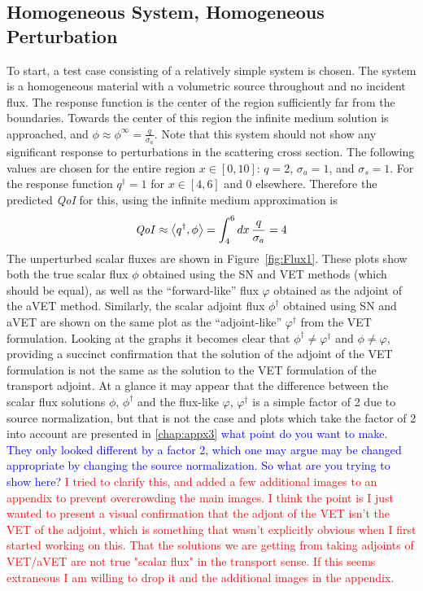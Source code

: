 \documentclass[12pt]{report}
\newcommand{\bra}{\left\langle}
\newcommand{\ket}{\right\rangle}
\newcommand{\sigs}{\sigma_s}
\newcommand{\siga}{\sigma_a}
\newcommand{\qoi}{{\it QoI}\xspace}
\newcommand{\comment}[2]{\marginpar{\textcolor{#2}{$\star$}}\textcolor{#2}{#1}\newline}
\newcommand{\iwh}[1]{\comment{#1}{red}}
\newcommand{\jcr}[1]{\comment{#1}{blue}}
\newcommand{\iwh}[1]{\phantom{a}}
\newcommand{\jcr}[1]{\phantom{a}}
\begin{document}
\subsection{Homogeneous System, Homogeneous Perturbation}
To start, a test case consisting of a relatively simple system is chosen. The system is a homogeneous material with a volumetric source throughout and no incident flux. The response function is the center of the region sufficiently far from the boundaries. Towards the center of this region the infinite medium solution is approached, and $\phi \approx \phi^\infty = \frac{q}{\siga}$. Note that this system should not show any significant response to perturbations in the scattering cross section. The following values are chosen for the entire region $x \in [0,10]$: $q=2$, $\siga=1$, and $\sigs=1$. For the response function $q^\dag=1$ for $x\in[4,6]$ and $0$ elsewhere. Therefore the predicted \qoi for this, using the infinite medium approximation is
\begin{equation}
\qoi \approx \bra q^\dag , \phi \ket = \int_4^6 dx \, \frac{q}{\siga} = 4
\end{equation}
The unperturbed scalar fluxes are shown in Figure~\ref{fig:Flux1}. These plots show both the true scalar flux $\phi$ obtained using the SN and VET methods (which should be equal), as well as the ``forward-like'' flux $\varphi$ obtained as the adjoint of the aVET method. Similarly, the scalar adjoint flux $\phi^\dag$ obtained using SN and aVET are shown on the same plot as the ``adjoint-like'' $\varphi^\dag$ from the VET formulation. Looking at the graphs it becomes clear that $\phi^\dag \neq \varphi^\dag$ and $\phi \neq \varphi$, providing a succinct confirmation that the solution of the adjoint of the VET formulation is not the same as the solution to the VET formulation of the transport adjoint. At a glance it may appear that the difference between the scalar flux solutions $\phi$, $\phi^\dag$ and the flux-like $\varphi$, $\varphi^\dag$ is a simple factor of 2 due to source normalization, but that is not the case and plots which take the factor of 2 into account are presented in \ref{chap:appx3}
\jcr{what point do you want to make. They only looked different by a factor 2, which one may argue may be changed appropriate by changing the source normalization. So what are you trying to show here?}
\iwh{I tried to clarify this, and added a few additional images to an appendix to prevent overcrowding the main images. I think the point is I just wanted to present a visual confirmation that the adjont of the VET isn't the VET of the adjoint, which is something that wasn't explicitly obvious when I first started working on this. That the solutions we are getting from taking adjoints of VET/aVET are not true "scalar flux" in the transport sense. If this seems extraneous I am willing to drop it and the additional images in the appendix.}
\end{document}
